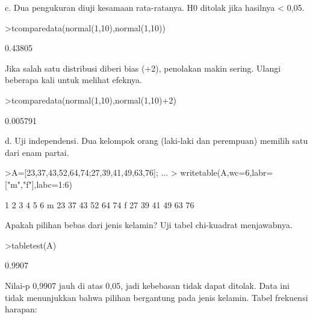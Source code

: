 \documentclass[a4paper,10pt]{article}
\begin{document}
\begin{eulernotebook}
\begin{eulercomment}
\begin{eulercomment}
\begin{eulercomment}
\begin{eulercomment}
\begin{eulercomment}
\begin{eulercomment}
\begin{eulercomment}
\begin{eulercomment}
\begin{eulercomment}
\begin{eulercomment}
\begin{eulercomment}
\begin{eulercomment}
\begin{eulercomment}
\begin{eulercomment}
\begin{eulercomment}
\begin{eulercomment}
\begin{eulercomment}
\begin{eulercomment}
\begin{eulercomment}
\begin{eulercomment}
\begin{eulercomment}
\begin{eulercomment}
\begin{eulercomment}
c. Dua pengukuran diuji kesamaan rata-ratanya. H0 ditolak jika hasilnya \textless{} 0,05.
\end{eulercomment}
\begin{eulerprompt}
>tcomparedata(normal(1,10),normal(1,10))
\end{eulerprompt}
\begin{euleroutput}
  0.43805
\end{euleroutput}
\begin{eulercomment}
Jika salah satu distribusi diberi bias (+2), penolakan makin sering. Ulangi beberapa kali
untuk melihat efeknya.
\end{eulercomment}
\begin{eulerprompt}
>tcomparedata(normal(1,10),normal(1,10)+2)
\end{eulerprompt}
\begin{euleroutput}
  0.005791
\end{euleroutput}
\begin{eulercomment}
d. Uji independensi. Dua kelompok orang (laki-laki dan perempuan) memilih satu dari enam
partai.
\end{eulercomment}
\begin{eulerprompt}
>A=[23,37,43,52,64,74;27,39,41,49,63,76];  ...
>  writetable(A,wc=6,labr=["m","f"],labc=1:6)
\end{eulerprompt}
\begin{euleroutput}
             1     2     3     4     5     6
       m    23    37    43    52    64    74
       f    27    39    41    49    63    76
\end{euleroutput}
\begin{eulercomment}
Apakah pilihan bebas dari jenis kelamin? Uji tabel chi-kuadrat menjawabnya.
\end{eulercomment}
\begin{eulerprompt}
>tabletest(A)
\end{eulerprompt}
\begin{euleroutput}
  0.9907
\end{euleroutput}
\begin{eulercomment}
Nilai-p 0,9907 jauh di atas 0,05, jadi kebebasan tidak dapat ditolak. Data ini tidak
menunjukkan bahwa pilihan bergantung pada jenis kelamin. Tabel frekuensi harapan:
\end{eulercomment}

\end{eulercomment}
\end{eulercomment}
\end{eulercomment}
\end{eulercomment}
\end{eulercomment}
\end{eulercomment}
\end{eulercomment}
\end{eulercomment}
\end{eulercomment}
\end{eulercomment}
\end{eulercomment}
\end{eulercomment}
\end{eulercomment}
\end{eulercomment}
\end{eulercomment}
\end{eulercomment}
\end{eulercomment}
\end{eulercomment}
\end{eulercomment}
\end{eulercomment}
\end{eulercomment}
\end{eulercomment}
\end{eulernotebook}
\end{document}

